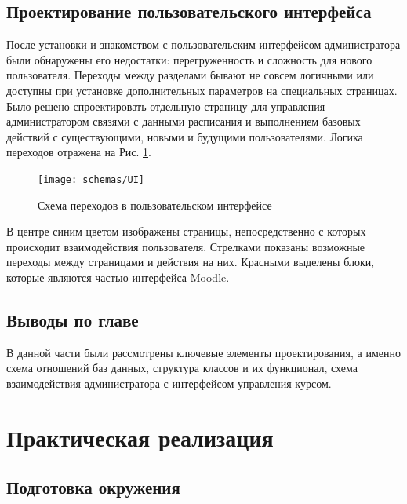 \documentclass[a4paper,14pt]{article}
\begin{document}
\subsection{Проектирование пользовательского интерфейса}

После установки и знакомством с пользовательским интерфейсом администратора были обнаружены его недостатки: перегруженность и сложность для нового пользователя.
Переходы между разделами бывают не совсем логичными или доступны при установке дополнительных параметров на специальных страницах.
Было решено спроектировать отдельную страницу для управления администратором связями с данными расписания и выполнением базовых действий с существующими, новыми и будущими пользователями.
Логика переходов отражена на Рис. \ref{img:UI}.

\begin{figure}[H]
	\centering		
	\texttt{[image: schemas/UI]}
	\caption{Схема переходов в пользовательском интерфейсе}\label{img:UI}
\end{figure}

В центре синим цветом изображены страницы, непосредственно с которых происходит взаимодействия пользователя.
Стрелками показаны возможные переходы между страницами и действия на них.
Красными выделены блоки, которые являются частью интерфейса Moodle.






\subsection{Выводы по главе}

В данной части были рассмотрены ключевые элементы проектирования, а именно схема отношений баз данных, структура классов и их функционал, схема взаимодействия администратора с интерфейсом управления курсом.


\section{Практическая реализация}
\subsection{Подготовка окружения}
\end{document}
